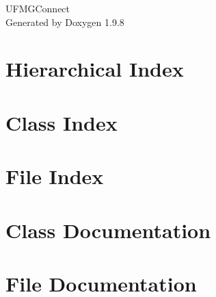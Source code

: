 \documentclass[twoside]{book}
\newcommand{\+}{\discretionary{\mbox{\scriptsize$\hookleftarrow$}}{}{}}
\newcommand{\clearemptydoublepage}{%
    \newpage{\pagestyle{empty}\cleardoublepage}%
  }
\begin{document}
  \raggedbottom
    \hypersetup{pageanchor=false,
                bookmarksnumbered=true,
                pdfencoding=unicode
               }
  \begin{titlepage}
  \vspace*{7cm}
  \begin{center}%
  {\Large UFMGConnect}\\
  \vspace*{1cm}
  {\large Generated by Doxygen 1.9.8}\\
  \end{center}
  \end{titlepage}
  \clearemptydoublepage
  \tableofcontents
  \clearemptydoublepage
  \hypersetup{pageanchor=true}
\chapter{Hierarchical Index}

\chapter{Class Index}

\chapter{File Index}

\chapter{Class Documentation}











\chapter{File Documentation}































  \backmatter
  \newpage
  \clearemptydoublepage
  \printindex
\end{document}

